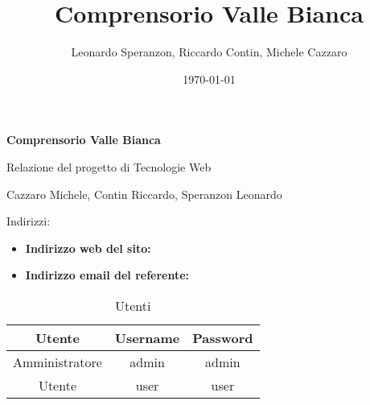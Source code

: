 \documentclass[12pt, a4paper]{article}
\title{Comprensorio Valle Bianca}
\author{Leonardo Speranzon, Riccardo Contin, Michele Cazzaro}
\date{\today}
\begin{document}
    \begin{titlepage}
        \begin{center}
            \vspace*{1cm}
            
            \Huge
            \textbf{Comprensorio Valle Bianca}

            \vspace{0.5cm}
            \LARGE
            Relazione del progetto di Tecnologie Web

            \vspace{1.5cm}
            \Large
            Cazzaro Michele, Contin Riccardo, Speranzon Leonardo
        \end{center}
            \vfill

            \large
            Indirizzi:
            \begin{itemize}
                \item \textbf{Indirizzo web del sito: } \url{}
                \item \textbf{Indirizzo email del referente: } \url{}
            \end{itemize}

            \begin{table}[H]
                \centering
                \begin{tabular}{|c|c|c|}
                    \hline
                    \rowcolor[HTML]{96FFFB} 
                    \textbf{Utente} & \textbf{Username} & \textbf{Password} \\ \hline
                    Amministratore & admin & admin \\ \hline
                    Utente & user & user \\ \hline
                \end{tabular}
                \caption{Utenti}
            \end{table}
        
    \end{titlepage}

    \tableofcontents

    \newpage

    
    \newpage
    
    \newpage
    
    \newpage
    
\end{document}
